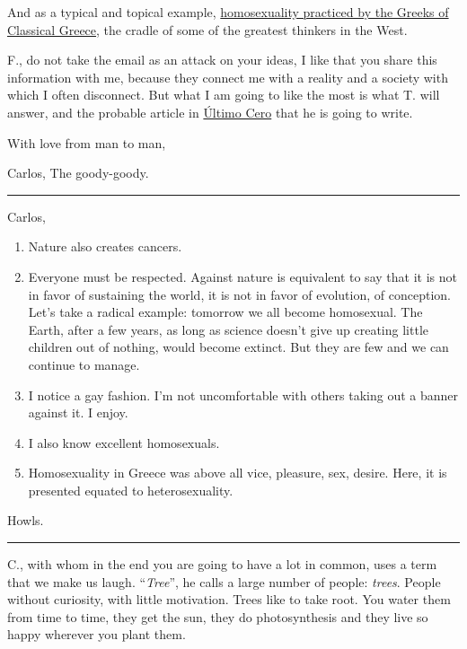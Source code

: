 \documentclass[]{book}
\begin{document}
And as a typical and topical example, \href{https://en.wikipedia.org/wiki/Homosexuality\#Classical_period}{homosexuality practiced by the Greeks of Classical Greece}, the cradle of some of the greatest thinkers in the West.

F., do not take the email as an attack on your ideas, I like that you share this information with me, because they connect me with a reality and a society with which I often disconnect. But what I am going to like the most is what T. will answer, and the probable article in \href{http://ultimocero.com/}{Último Cero} that he is going to write.

With love from man to man,

Carlos, The goody-goody.

\begin{center}\rule{0.5\linewidth}{\linethickness}\end{center}

Carlos,

\begin{enumerate}
\def\labelenumi{\arabic{enumi}.}
\item
  Nature also creates cancers.
\item
  Everyone must be respected. Against nature is equivalent to say that it is not in favor of sustaining the world, it is not in favor of evolution, of conception. Let's take a radical example: tomorrow we all become homosexual. The Earth, after a few years, as long as science doesn't give up creating little children out of nothing, would become extinct. But they are few and we can continue to manage.
\item
  I notice a gay fashion. I'm not uncomfortable with others taking out a banner against it. I enjoy.
\item
  I also know excellent homosexuals.
\item
  Homosexuality in Greece was above all vice, pleasure, sex, desire. Here, it is presented equated to heterosexuality.
\end{enumerate}

Howls.

\begin{center}\rule{0.5\linewidth}{\linethickness}\end{center}

C., with whom in the end you are going to have a lot in common, uses a term that we make us laugh. ``\emph{Tree}'', he calls a large number of people: \emph{trees}. People without curiosity, with little motivation. Trees like to take root. You water them from time to time, they get the sun, they do photosynthesis and they live so happy wherever you plant them.
\end{document}
